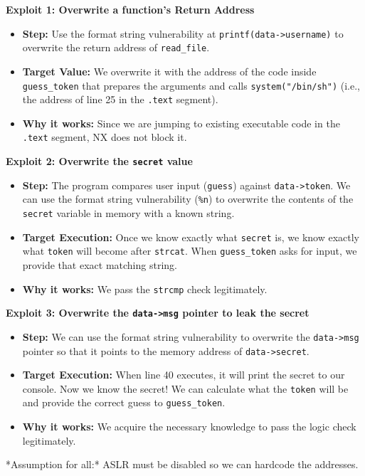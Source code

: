\documentclass{article}
\begin{document}
\textbf{Exploit 1: Overwrite a function's Return Address}
\begin{itemize}
    \item \textbf{Step:} Use the format string vulnerability at \texttt{printf(data->username)} to overwrite the return address of \texttt{read\_file}.
    \item \textbf{Target Value:} We overwrite it with the address of the code inside \texttt{guess\_token} that prepares the arguments and calls \texttt{system("/bin/sh")} (i.e., the address of line 25 in the \texttt{.text} segment).
    \item \textbf{Why it works:} Since we are jumping to existing executable code in the \texttt{.text} segment, NX does not block it.

\end{itemize}
\textbf{Exploit 2: Overwrite the \texttt{secret} value}
\begin{itemize}
    \item \textbf{Step:} The program compares user input (\texttt{guess}) against \texttt{data->token}. We can use the format string vulnerability (\texttt{\%n}) to overwrite the contents of the \texttt{secret} variable in memory with a known string.
    \item \textbf{Target Execution:} Once we know exactly what \texttt{secret} is, we know exactly what \texttt{token} will become after \texttt{strcat}. When \texttt{guess\_token} asks for input, we provide that exact matching string.
    \item \textbf{Why it works:} We pass the \texttt{strcmp} check legitimately.

\end{itemize}
\textbf{Exploit 3: Overwrite the \texttt{data->msg} pointer to leak the secret}
\begin{itemize}
    \item \textbf{Step:} We can use the format string vulnerability to overwrite the \texttt{data->msg} pointer so that it points to the memory address of \texttt{data->secret}.
    \item \textbf{Target Execution:} When line 40 executes, it will print the secret to our console. Now we know the secret! We can calculate what the \texttt{token} will be and provide the correct guess to \texttt{guess\_token}.
    \item \textbf{Why it works:} We acquire the necessary knowledge to pass the logic check legitimately.

\end{itemize}
*Assumption for all:* ASLR must be disabled so we can hardcode the addresses.
\end{document}
